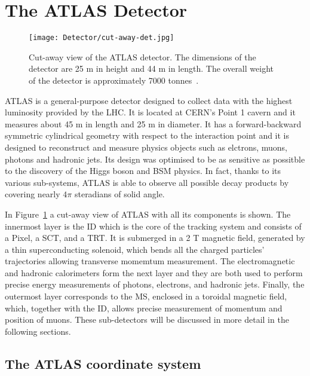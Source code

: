 	\section{The ATLAS Detector}
	\label{sec:det}

		\begin{figure}[!htb]
			\texttt{[image: Detector/cut-away-det.jpg]}
			\caption{Cut-away view of the \ac{ATLAS} detector. The dimensions of the detector are 25 m in height and 44 m in length. The overall weight of the detector is approximately 7000 tonnes~\cite{Lefevre2008}.}
			\label{fig:cut-away-det}
		\end{figure}


		\ac{ATLAS} is a general-purpose detector designed to collect data with the highest luminosity provided by the \ac{LHC}. It is located at \ac{CERN}'s Point 1 cavern and it measures about 45 m in length and 25 m in diameter. It has a forward-backward symmetric cylindrical geometry with respect to the interaction point and it is designed to reconstruct and measure physics objects such as elctrons, muons, photons and hadronic jets. Its design was optimised to be as sensitive as possitble to the discovery of the Higgs boson and \ac{BSM} physics. In fact, thanks to its various sub-systems, \ac{ATLAS} is able to observe all possible decay products by covering nearly $4\pi$ steradians of solid angle.

		In Figure~\ref{fig:cut-away-det} a cut-away view of \ac{ATLAS} with all its components is shown. The innermost layer is the \ac{ID} which is the core of the tracking system and consists of a Pixel, a \ac{SCT}, and a \ac{TRT}. It is submerged in a 2 T magnetic field, generated by a thin superconducting solenoid, which bends all the charged particles' trajectories allowing transverse momemtum measurement. The electromagnetic and hadronic calorimeters form the next layer and they are both used to perform precise energy measurements of photons, electrons, and hadronic jets. Finally, the outermost layer corresponds to the \ac{MS}, enclosed in a toroidal magnetic field, which, together with the \ac{ID},  allows precise measurement of momentum and position of muons. These sub-detectors will be discussed in more detail in the following sections. 
	

		\subsection*{The ATLAS coordinate system}
		\label{par:coord}
			
